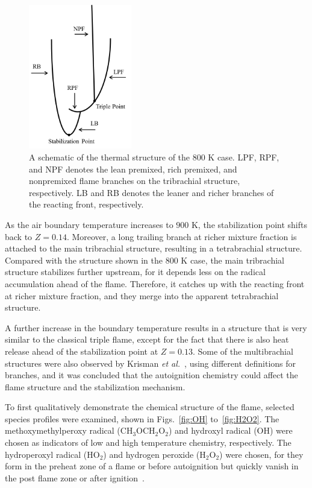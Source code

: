 \documentclass[review,3p,times]{elsarticle}
\begin{document}
\begin{figure}[t]
  \centering
  \scriptsize
  \includegraphics[width=0.4\textwidth]{schematic_800.png}
  \normalsize
  \caption{A schematic of the thermal structure of the $800$ K case.  LPF, RPF, and NPF denotes the lean premixed, rich premixed, and nonpremixed flame branches on the tribrachial structure, respectively.  LB and RB denotes the leaner and richer branches of the reacting front, respectively.}
  \label{fig:schematic_800}
\end{figure}

As the air boundary temperature increases to $900$ K, the stabilization point shifts back to $Z = 0.14$.  Moreover, a long trailing branch at richer mixture fraction is attached to the main tribrachial structure, resulting in a tetrabrachial structure.  Compared with the structure shown in the $800$ K case, the main tribrachial structure stabilizes further upstream, for it depends less on the radical accumulation ahead of the flame.  Therefore, it catches up with the reacting front at richer mixture fraction, and they merge into the apparent tetrabrachial structure.

A further increase in the boundary temperature results in a structure that is very similar to the classical triple flame, except for the fact that there is also heat release ahead of the stabilization point at $Z = 0.13$.  Some of the multibrachial structures were also observed by Krisman \emph{et al.}~\cite{krisman14}, using different definitions for branches, and it was concluded that the autoignition chemistry could affect the flame structure and the stabilization mechanism.  

To first qualitatively demonstrate the chemical structure of the flame, selected species profiles were examined, shown in Figs.~\ref{fig:OH} to~\ref{fig:H2O2}.  The methoxymethylperoxy radical (CH$_3$OCH$_2$O$_2$) and hydroxyl radical (OH) were chosen as indicators of low and high temperature chemistry, respectively.  The hydroperoxyl radical (HO$_2$) and hydrogen peroxide (H$_2$O$_2$) were chosen, for they form in the preheat zone of a flame or before autoignition but quickly vanish in the post flame zone or after ignition~\cite{yoo09}.
\end{document}
